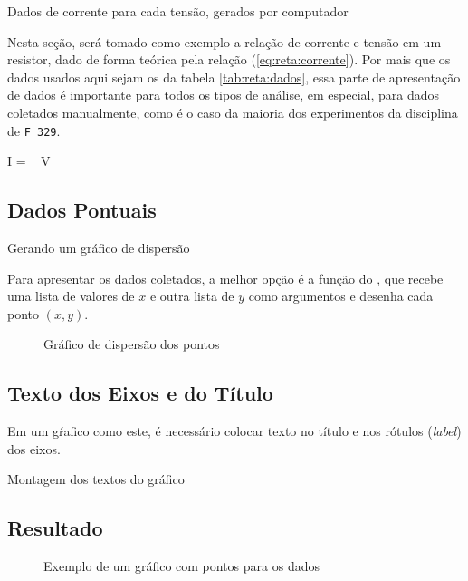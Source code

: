 \begin{table}[H]
    \centering
    
    \caption{Dados de corrente para cada tensão, gerados por computador}
    \label{tab:reta:dados}
\end{table}

Nesta seção, será tomado como exemplo a relação de corrente e tensão em um resistor, dado de forma teórica pela relação (\ref{eq:reta:corrente}). Por mais que os dados usados aqui sejam os da tabela \ref{tab:reta:dados}, essa parte de apresentação de dados é importante para todos os tipos de análise, em especial, para dados coletados manualmente, como é o caso da maioria dos experimentos da disciplina de \texttt{F 329}.

\begin{equacao} \label{eq:reta:corrente}
    I =  ~ V
\end{equacao}


\subsection{Dados Pontuais}

    \begin{listing}[H]
        \caption{Gerando um gráfico de dispersão}
        \label{code:reta:scatter}

    \end{listing}

    Para apresentar os dados coletados, a melhor opção é a função  do \pyplot, que recebe uma lista de valores de $x$ e outra lista de $y$ como argumentos e desenha cada ponto $(x, y)$.

    \begin{figure}[htbp]
        \centering
        

        \caption{Gráfico de dispersão dos pontos}
        \label{fig:reta:dados}
    \end{figure}


\subsection{Texto dos Eixos e do Título}

    Em um gŕafico como este, é necessário colocar texto no título e nos rótulos (\textit{label}) dos eixos.

    \begin{listing}[H]
        \caption{Montagem dos textos do gráfico}
        \label{code:reta:textos}

    \end{listing}


\subsection{Resultado}

    \begin{figure}[htbp]
        \centering
        

        \caption{Exemplo de um gráfico com pontos para os dados}
        \label{fig:reta:resultado}
    \end{figure}
